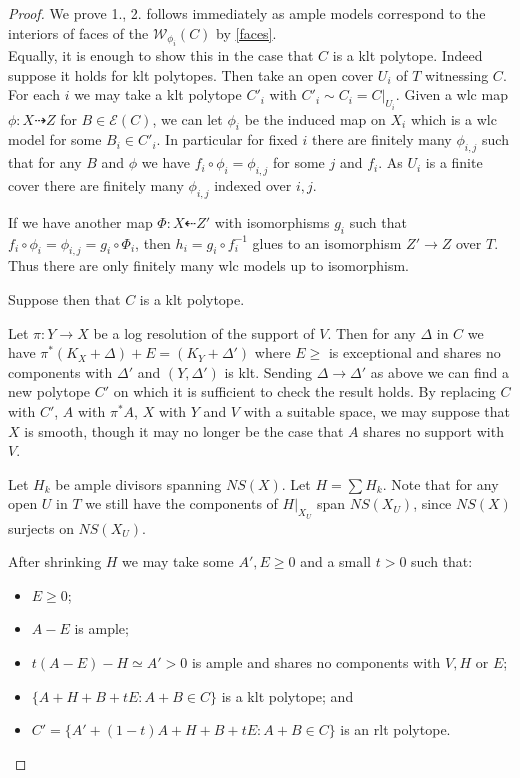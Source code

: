 \documentclass[a4paper,12pt]{amsart}
\begin{document}
	\begin{proof}
		
		We prove 1., 2. follows immediately as ample models correspond to the interiors of faces of the $\mathcal{W}_{\phi_{i}}(C)$ by \autoref{faces}.\\	
		
		Equally, it is enough to show this in the case that $C$ is a klt polytope. Indeed suppose it holds for klt polytopes. Then take an open cover $U_{i}$ of $T$ witnessing $C$. For each $i$ we may take a klt polytope $C'_{i}$ with $C'_{i} \sim C_{i}=C|_{U_{i}}$. Given a wlc map $\phi:X \dashrightarrow Z$ for $B \in \mathcal{E}(C)$, we can let $\phi_{i}$ be the induced map on $X_{i}$ which is a wlc model for some $B_{i} \in C'_{i}$. In particular for fixed $i$ there are finitely many $\phi_{i,j}$ such that for any $B$ and $\phi$ we have $f_{i} \circ \phi_{i}=\phi_{i,j}$ for some $j$ and $f_{i}$. As $U_{i}$ is a finite cover there are finitely many $\phi_{i,j}$ indexed over $i,j$.
		
		If we have another map $\Phi:X \dashleftarrow Z'$ with isomorphisms $g_{i}$ such that $f_{i} \circ \phi_{i}=\phi_{i,j}= g_{i} \circ \Phi_{i}$, then $h_{i}=g_{i} \circ f^{-1}_{i}$ glues to an isomorphism $Z' \to Z$ over $T$. Thus there are only finitely many wlc models up to isomorphism.
		
		Suppose then that $C$ is a klt polytope.		
		
		Let $\pi:Y \to X$ be a log resolution of the support of $V$. Then for any $\Delta$ in $C$ we have $\pi^{*}(K_{X}+\Delta)+E=(K_{Y}+\Delta')$ where $E \geq $ is exceptional and shares no components with $\Delta'$ and $(Y,\Delta')$ is klt. Sending $\Delta \to \Delta'$ as above we can find a new polytope $C'$ on which it is sufficient to check the result holds. By replacing $C$ with $C'$, $A$ with $\pi^{*}A$, $X$ with $Y$ and $V$ with a suitable space, we may suppose that $X$ is smooth, though it may no longer be the case that $A$ shares no support with $V$. 
		
		Let $H_{k}$ be ample divisors spanning $NS(X)$. Let $H= \sum H_{k}$. Note that for any open $U$ in $T$ we still have the components of $H|_{X_{U}}$ span $NS(X_{U})$, since $NS(X)$ surjects on $NS(X_{U})$.
		
		After shrinking $H$ we may take some $A',E \geq 0$ and a small $t>0$ such that:
		\begin{itemize}
			\item $E \geq 0$;
			\item $A-E$ is ample;
			\item $t(A-E)-H \simeq A' > 0$ is ample and shares no components with $V,H$ or $E$;
			\item $\{A+H+B+tE \colon A+B \in C\}$ is a klt polytope; and
			\item $C'=\{A'+(1-t)A+H+B+tE \colon A+B \in C\}$ is an rlt polytope.
		\end{itemize}
		

\end{proof}
\end{document}
